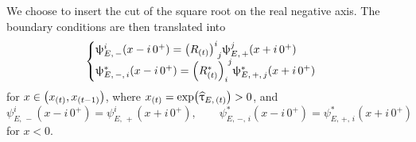 We choose to insert the cut of the square root on the real negative axis.
The boundary conditions are then translated into
\begin{equation}
  \begin{cases}
    \psi_{E,\, -}^i( x - i\, 0^+ )
    =
    \tensor{\qty( R_{(t)} )}{^i_j} \psi_{E,\, +}^j( x + i\, 0^+ )
    \\
    \psi^{*}_{E,\, -,\, i}( x - i\, 0^+ ) =
    \tensor{\qty( R_{(t)}^* )}{_i^j} \psi^{*}_{E,\, +,\, j}( x + i\, 0^+ )
  \end{cases}
\end{equation}
for $x \in \qty( x_{(t)}, x_{(t-1)} )$, where $x_{(t)} = \exp( \widehat{\uptau}_{E,\, (t)} ) > 0$, and
\begin{equation}
  \psi_{E,\, -}^i( x - i\, 0^+ )
  =
  \psi_{E,\, +}^i( x + i\, 0^+ ),
  \qquad
  \psi^{*}_{E,\, -,\, i}( x - i\, 0^+ )
  =
  \psi^{*}_{E,\, +,\, i}( x + i\, 0^+ )
\end{equation}
for $x<0$.

